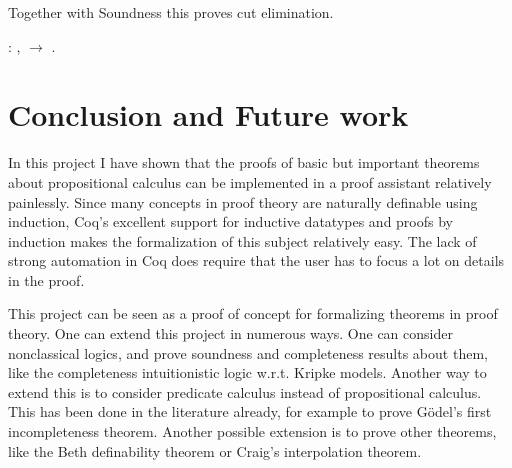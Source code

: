 \documentclass{article}
\newenvironment{code}%
 {\small\begin{list}{}%
         {\setlength{\leftmargin}{10mm}}%
         \item[]%
 }
 {\end{list}}
\begin{document}
Together with Soundness this proves cut elimination.
\begin{code}
\coqdocnoindent
{}  : \coqdockw{\ensuremath{\forall}}  ,    \ensuremath{\rightarrow}   .\coqdoceol
\end{code}
\section{Conclusion and Future work}
In this project I have shown that the proofs of basic but important theorems about propositional calculus can be implemented in a proof assistant relatively painlessly. Since many concepts in proof theory are naturally definable using induction, Coq's excellent support for inductive datatypes and proofs by induction makes the formalization of this subject relatively easy. The lack of strong automation in Coq does require that the user has to focus a lot on details in the proof.

This project can be seen as a proof of concept for formalizing theorems in proof theory. One can extend this project in numerous ways. One can consider nonclassical logics, and prove soundness and completeness results about them, like the completeness intuitionistic logic w.r.t. Kripke models. Another way to extend this is to consider predicate calculus instead of propositional calculus. This has been done in the literature already, for example to prove Gödel's first incompleteness theorem.\citep{OConnor2005Incompleteness} Another possible extension is to prove other theorems, like the Beth definability theorem or Craig's interpolation theorem.


\end{document}
